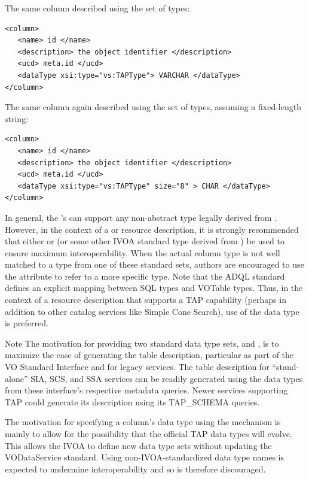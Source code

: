 \documentclass[11pt,a4paper]{ivoa}
\begin{document}
The same column described using the
 set of types:

\begin{lstlisting}
<column>
   <name> id </name>
   <description> the object identifier </description>
   <ucd> meta.id </ucd>
   <dataType xsi:type="vs:TAPType"> VARCHAR </dataType>
</column>
\end{lstlisting}

The same column again described using the
 set of types, assuming a fixed-length
string:

\begin{lstlisting}
<column>
   <name> id </name>
   <description> the object identifier </description>
   <ucd> meta.id </ucd>
   <dataType xsi:type="vs:TAPType" size="8" > CHAR </dataType>
</column>
\end{lstlisting}



In general, the 's 
can support any non-abstract type legally derived from
.  However, in the context of a
 or 
resource description, it is strongly recommended that either
 or  (or some other IVOA
standard type derived from ) be used to
ensure maximum interoperability.  When the actual column type is not
well matched to a type from one of these standard sets, authors are
encouraged to use the  attribute to refer to
a more specific type.  Note that the ADQL standard
\citep{todo:ADQL2.2} defines an explicit mapping between
SQL types and VOTable types.  Thus, in the context of a
 resource description that supports a
TAP capability (perhaps in addition to other catalog services like
Simple Cone Search), use of the
 data type is preferred.



\begin{admonition}{Note}
The motivation for providing two standard data type sets,
        and , is to maximize
       the ease of generating the table description, particular as
       part of the VO Standard Interface \citep{2017ivoa.spec.0524G}
       and for legacy services.  The table description for
       ``stand-alone'' SIA, SCS, and SSA services can be readily
       generated using the  data types from
       these interface's respective metadata queries.  Newer services
       supporting TAP could generate its description using its
       TAP\_SCHEMA queries.

       
       The motivation for specifying a column's data type using the
        mechanism is mainly to allow for the
       possibility that the official TAP data types will evolve.  This
       allows the IVOA to define new data type sets without updating
       the VODataService standard.  Using non-IVOA-standardized data
       type names is expected to undermine interoperability and so is
       therefore discouraged.  
\end{admonition}
\end{document}
